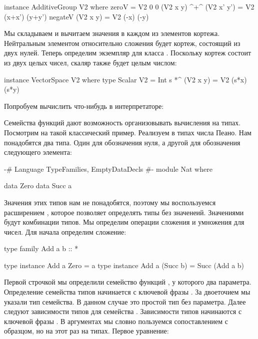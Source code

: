 \begin{code}
instance AdditiveGroup V2 where
    zeroV       = V2 0 0
    (V2 x y)  ^+^ (V2 x' y')  = V2 (x+x') (y+y')
    negateV (V2 x y)   = V2 (-x) (-y)
\end{code}

Мы складываем и вычитаем значения в каждом из элементов
кортежа. Нейтральным элементом относительно сложения
будет кортеж, состоящий из двух нулей.
Теперь определим экземпляр для класса .
Поскольку кортеж состоит из двух целых чисел, 
скаляр также будет целым числом:

\begin{code}
instance VectorSpace V2 where
    type Scalar V2 = Int
    s *^ (V2 x y) = V2 (s*x) (s*y)
\end{code}

Попробуем вычислить что-нибудь в интерпретаторе:



Семейства функций дают возможность организовывать вычисления
на типах. Посмотрим на такой классический пример. Реализуем
в типах числа Пеано. Нам понадобятся два типа. Один для 
обозначения нуля, а другой для обозначения следующего
элемента:

\begin{code}
{-# Language TypeFamilies, EmptyDataDecls #-}
module Nat where

data Zero
data Succ a
\end{code}

Значения этих типов нам не понадобятся, поэтому мы 
воспользуемся расширением , которое
позволяет определять типы без значенеий. Значениями 
будут комбинации типов. Мы определим операции сложения
и умножения для чисел. Для начала определим сложение:

\begin{code}
type family Add a b :: *

type instance Add a Zero        = a
type instance Add a (Succ b)    = Succ (Add a b)
\end{code}

Первой строчкой мы определили семейство функций ,
у которого два параметра. Определение семейства типов
начинается с ключевой фразы  .
За двоеточием мы указали тип
семейства. В данном случае это простой тип без параметра.
Далее следуют зависимости типов
для семейства . Зависимости типов начинаются
с ключевой фразы  
. В аргументах мы словно пользуемся
сопоставлением с образцом, но на этот раз на типах. 
Первое уравнение:


